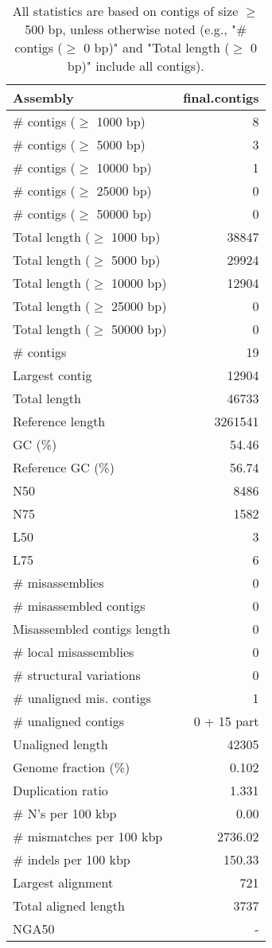 \documentclass[12pt,a4paper]{article}
\begin{document}
\begin{table}[ht]
\begin{center}
\caption{All statistics are based on contigs of size $\geq$ 500 bp, unless otherwise noted (e.g., "\# contigs ($\geq$ 0 bp)" and "Total length ($\geq$ 0 bp)" include all contigs).}
\begin{tabular}{|l*{1}{|r}|}
\hline
Assembly & final.contigs \\ \hline
\# contigs ($\geq$ 1000 bp) & 8 \\ \hline
\# contigs ($\geq$ 5000 bp) & 3 \\ \hline
\# contigs ($\geq$ 10000 bp) & 1 \\ \hline
\# contigs ($\geq$ 25000 bp) & 0 \\ \hline
\# contigs ($\geq$ 50000 bp) & 0 \\ \hline
Total length ($\geq$ 1000 bp) & 38847 \\ \hline
Total length ($\geq$ 5000 bp) & 29924 \\ \hline
Total length ($\geq$ 10000 bp) & 12904 \\ \hline
Total length ($\geq$ 25000 bp) & 0 \\ \hline
Total length ($\geq$ 50000 bp) & 0 \\ \hline
\# contigs & 19 \\ \hline
Largest contig & 12904 \\ \hline
Total length & 46733 \\ \hline
Reference length & 3261541 \\ \hline
GC (\%) & 54.46 \\ \hline
Reference GC (\%) & 56.74 \\ \hline
N50 & 8486 \\ \hline
N75 & 1582 \\ \hline
L50 & 3 \\ \hline
L75 & 6 \\ \hline
\# misassemblies & 0 \\ \hline
\# misassembled contigs & 0 \\ \hline
Misassembled contigs length & 0 \\ \hline
\# local misassemblies & 0 \\ \hline
\# structural variations & 0 \\ \hline
\# unaligned mis. contigs & 1 \\ \hline
\# unaligned contigs & 0 + 15 part \\ \hline
Unaligned length & 42305 \\ \hline
Genome fraction (\%) & 0.102 \\ \hline
Duplication ratio & 1.331 \\ \hline
\# N's per 100 kbp & 0.00 \\ \hline
\# mismatches per 100 kbp & 2736.02 \\ \hline
\# indels per 100 kbp & 150.33 \\ \hline
Largest alignment & 721 \\ \hline
Total aligned length & 3737 \\ \hline
NGA50 & - \\ \hline
\end{tabular}
\end{center}
\end{table}
\end{document}
